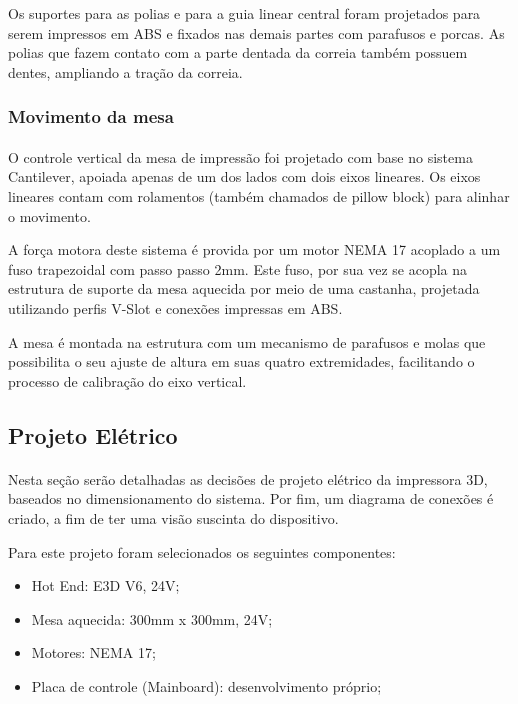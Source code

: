 \documentclass[12pt, english]{article}
\begin{document}
Os suportes para as polias e para a guia linear central foram projetados para serem impressos em ABS e fixados nas demais partes com parafusos e porcas. As polias que fazem contato com a parte dentada da correia também possuem dentes, ampliando a tração da correia.

\subsubsection{Movimento da mesa}

\paragraph{}
O controle vertical da mesa de impressão foi projetado com base no sistema Cantilever, apoiada apenas de um dos lados com dois eixos lineares. Os eixos lineares contam com rolamentos (também chamados de pillow block) para alinhar o movimento.

A força motora deste sistema é provida por um motor NEMA 17 acoplado a um fuso trapezoidal com passo passo 2mm. Este fuso, por sua vez se acopla na estrutura de suporte da mesa aquecida por meio de uma castanha, projetada utilizando perfis V-Slot e conexões impressas em ABS.

A mesa é montada na estrutura com um mecanismo de parafusos e molas que possibilita o seu ajuste de altura em suas quatro extremidades, facilitando o processo de calibração do eixo vertical. 

\subsection{Projeto Elétrico}

\paragraph{}
Nesta seção serão detalhadas as decisões de projeto elétrico da impressora 3D, baseados no dimensionamento do sistema. Por fim, um diagrama de conexões é criado, a fim de ter uma visão suscinta do dispositivo. 

Para este projeto foram selecionados os seguintes componentes:

\begin{itemize}
	\item {
		Hot End: E3D V6, 24V;
	}
	\item {
		Mesa aquecida: 300mm x 300mm, 24V;
	}
	\item {
		Motores: NEMA 17;
	}
	\item {
		Placa de controle (Mainboard): desenvolvimento próprio;
	}
\end{itemize}
\end{document}
